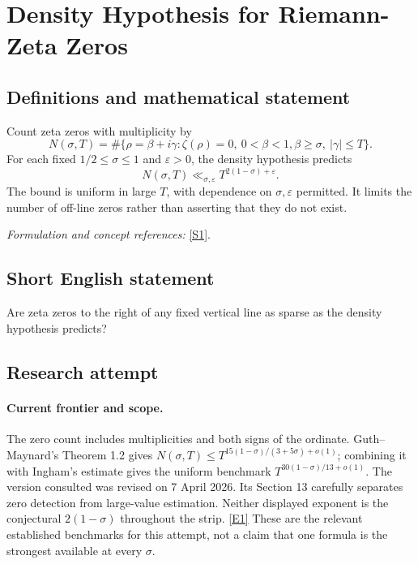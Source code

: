 \documentclass[11pt,a4paper]{article}
\newcommand{\sref}[2]{\hyperlink{source:#1:#2}{[S#2]}}
\newcommand{\eref}[2]{\hyperlink{extra:#1:#2}{[E#2]}}
\newif\ifshowcatalogue
\newcommand{\cataloguescope}[1]{\ifshowcatalogue
 \paragraph{Exact scope in the supplied catalogue.}
 \begin{quote}\small #1\end{quote}\fi}
\numberwithin{equation}{section}
\begin{document}
\setcounter{section}{0}
\clearpage
\section*{\texorpdfstring{Density Hypothesis for Riemann-Zeta Zeros}{Density Hypothesis for Riemann-Zeta Zeros}}\label{30005276}
\subsection{Definitions and mathematical statement}
Count zeta zeros with multiplicity by
\[
 N(\sigma,T)=\#\{\rho=\beta+i\gamma:\zeta(\rho)=0,\ 0<\beta<1,
                                  \beta\ge\sigma,\ |\gamma|\le T\}.
\]
For each fixed $1/2\le\sigma\le1$ and $\varepsilon>0$, the density hypothesis predicts
\[
 N(\sigma,T)\ll_{\sigma,\varepsilon}T^{2(1-\sigma)+\varepsilon}.
\]
The bound is uniform in large $T$, with dependence on $\sigma,\varepsilon$ permitted. It limits the number of off-line zeros rather than asserting that they do not exist.
\par\smallskip\textit{Formulation and concept references:} \sref{30005276}{1}.
\cataloguescope{Prove that for every sigma with 1/2 <= sigma <= 1 and every epsilon > 0, the number N(sigma,T) of nontrivial zeros rho = beta + i gamma of the Riemann zeta function with beta >= sigma and |gamma| <= T satisfies N(sigma,T) <= C\_\{sigma,epsilon\} T\textasciicircum{}\{2(1-sigma)+epsilon\} for all sufficiently large T.}
\subsection{Short English statement}
Are zeta zeros to the right of any fixed vertical line as sparse as the density hypothesis predicts?
\subsection{Research attempt}

\paragraph{Current frontier and scope.}
The zero count includes multiplicities and both signs of the ordinate.
Guth--Maynard's Theorem 1.2 gives
$N(\sigma,T)\leq T^{15(1-\sigma)/(3+5\sigma)+o(1)}$; combining it with
Ingham's estimate gives the uniform benchmark
$T^{30(1-\sigma)/13+o(1)}$.  The version consulted was revised on
7 April 2026.  Its Section 13 carefully separates zero detection from
large-value estimation.  Neither displayed exponent is the conjectural
$2(1-\sigma)$ throughout the strip. \eref{30005276}{1}
These are the relevant established benchmarks for this attempt, not a
claim that one formula is the strongest available at every $\sigma$.
\end{document}

